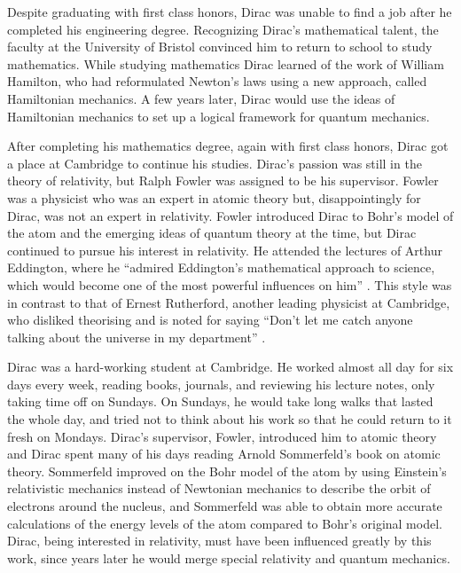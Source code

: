 \documentclass[12pt, oneside, letterpaper, fleqn]{article}
\begin{document}
Despite graduating with first class honors, Dirac was unable to find a
job after he completed his engineering degree. Recognizing Dirac's
mathematical talent, the faculty at the University of Bristol convinced
him to return to school to study mathematics. While studying mathematics
Dirac learned of the work of William Hamilton, who had reformulated
Newton's laws using a new approach, called Hamiltonian mechanics. A few
years later, Dirac would use the ideas of Hamiltonian mechanics to set up a
logical framework for quantum mechanics.

After completing his mathematics degree, again with first class honors,
Dirac got a place at Cambridge to continue his studies. Dirac's passion
was still in the theory of relativity, but Ralph Fowler was assigned to
be his supervisor. Fowler was a physicist who was an expert in atomic
theory but, disappointingly for Dirac, was not an expert in relativity.
Fowler introduced Dirac to Bohr's model of the atom and the emerging
ideas of quantum theory at the time, but Dirac continued to pursue his
interest in relativity. He attended the lectures of Arthur Eddington,
where he ``admired Eddington's mathematical approach to science, which
would become one of the most powerful influences on him'' \cite[pg.
61]{strangest_man}. This style was in contrast to that of Ernest
Rutherford, another leading physicist at Cambridge, who disliked
theorising and is noted for saying ``Don't let me catch anyone talking
about the universe in my department'' \cite[pg. 61]{strangest_man}.

Dirac was a hard-working student at Cambridge. He worked almost all day
for six days every week, reading books, journals, and reviewing his
lecture notes, only taking time off on Sundays. On Sundays, he would
take long walks that lasted the whole day, and tried not to think about
his work so that he could return to it fresh on Mondays. Dirac's
supervisor, Fowler, introduced him to atomic theory and Dirac spent many
of his days reading Arnold Sommerfeld's book on atomic theory.
Sommerfeld improved on the Bohr model of the atom by using Einstein's
relativistic mechanics instead of Newtonian mechanics to describe the
orbit of electrons around the nucleus, and Sommerfeld was able to obtain
more accurate calculations of the energy levels of the atom compared to
Bohr's original model. Dirac, being interested in relativity, must have
been influenced greatly by this work, since years later he would
merge special relativity and quantum mechanics.
\end{document}
